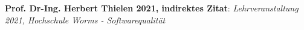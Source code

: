 %
%

\begin{thebibliography}{defaultmarken}
%
%	
	 \textbf{Prof. Dr-Ing. Herbert Thielen 2021, indirektes Zitat}: \emph{Lehrveranstaltung 2021, Hochschule Worms - Softwarequalität}
%
%
\end{thebibliography}
